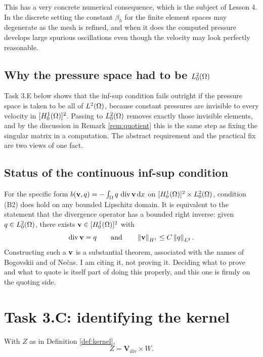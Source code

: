\documentclass[11pt,a4paper]{article}
\newcommand{\Vdiv}{\mathbf{V}_{\mathrm{div}}}
\newcommand{\Wsp}{W}
\newcommand{\Zsp}{Z}
\begin{document}
This has a very concrete numerical consequence, which is the subject of Lesson
4. In the discrete setting the constant $\beta_{h}$ for the finite element
spaces may degenerate as the mesh is refined, and when it does the computed
pressure develops large spurious oscillations even though the velocity may look
perfectly reasonable.

\subsection{Why the pressure space had to be $L^{2}_{0}(\Omega)$}

Task 3.E below shows that the inf-sup condition fails outright if the pressure
space is taken to be all of $L^{2}(\Omega)$, because constant pressures are invisible to
every velocity in $[H^{1}_{0}(\Omega)]^{2}$. Passing to $L^{2}_{0}(\Omega)$ removes exactly those
invisible elements, and by the discussion in Remark \ref{rem:quotient} this is
the same step as fixing the singular matrix in a computation. The abstract
requirement and the practical fix are two views of one fact.

\subsection{Status of the continuous inf-sup condition}

For the specific form $b(\mathbf{v},q) = -\int_\Omega q \,\operatorname{div} \mathbf{v} \,\mathrm{d}x$ on
$[H^{1}_{0}(\Omega)]^{2} \times L^{2}_{0}(\Omega)$, condition (B2) does hold on any bounded
Lipschitz domain. It is equivalent to the statement that the divergence operator
has a bounded right inverse: given $q \in L^{2}_{0}(\Omega)$, there exists
$\mathbf{v} \in [H^{1}_{0}(\Omega)]^{2}$ with
\[
  \operatorname{div} \mathbf{v} = q \qquad \text{and} \qquad \left\lVert \mathbf{v} \right\rVert_{H^{1}} \le C \left\lVert q \right\rVert_{L^{2}} .
\]
Constructing such a $\mathbf{v}$ is a substantial theorem, associated with the names of
Bogovskii and of Ne\v{c}as. I am citing it, not proving it. Deciding what to
prove and what to quote is itself part of doing this properly, and this one is
firmly on the quoting side.

\section{Task 3.C: identifying the kernel}

\begin{proposition}\label{prop:kernel}
With $\Zsp$ as in Definition \ref{def:kernel},
\[
  \Zsp = \Vdiv \times \Wsp .
\]
\end{proposition}
\end{document}
